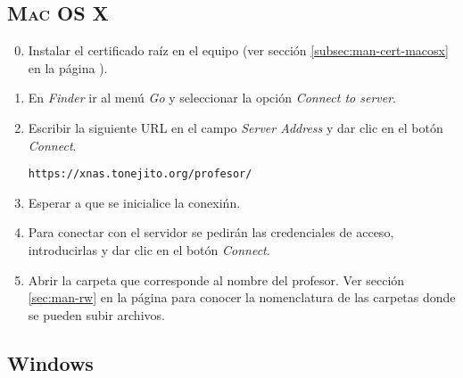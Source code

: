       \subsection {\textsc{Mac OS X}}
      \label{subsec:man-rw-macosx}

{
\linespread{0.1}
\begin{enumerate}
\setcounter{enumi}{-1} %

  \item Instalar el certificado ra\'{i}z en el equipo (ver secci\'{o}n \ref{subsec:man-cert-macosx} en la p\'{a}gina \pageref{subsec:man-cert-macosx}). 

  \item En \textsl{Finder} ir al men\'{u} \textsl{Go} y seleccionar la opci\'{o}n \textsl{Connect to server}.


  \item Escribir la siguiente \textsc{URL} en el campo \textsl{Server Address} y dar clic en el bot\'{o}n \textsl{Connect}.

    \texttt{https://xnas.tonejito.org/profesor/}


  \item Esperar a que se inicialice la conexi\'{n}n.


  \item Para conectar con el servidor se pedir\'{a}n las credenciales de acceso, introducirlas y dar clic en el bot\'{o}n \textsl{Connect}.


  \item Abrir la carpeta que corresponde al nombre del profesor. Ver secci\'{o}n \ref{sec:man-rw} en la p\'{a}gina \pageref{sec:man-rw} para conocer la nomenclatura de las carpetas donde se pueden subir archivos.


\end{enumerate}
}

      \label{man-rw-windows}
      \subsection {Windows}

